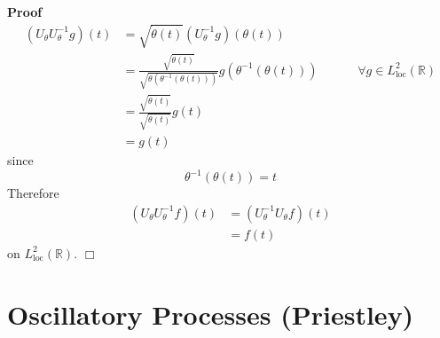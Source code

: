 \documentclass{article}
\newcommand{\tmop}[1]{\ensuremath{\operatorname{#1}}}
\newenvironment{proof}{\noindent\textbf{Proof\ }}{\hspace*{\fill}$\Box$\medskip}
\begin{document}
\begin{proof}
\begin{equation}
    \begin{array}{llcccc}
      (U_{\theta} U_{\theta}^{- 1} g) (t) & = \sqrt{\dot{\theta} (t)} 
      (U_{\theta}^{- 1} g) (\theta (t)) &  &  &  & \\
      & = \frac{\sqrt{\dot{\theta} (t)}}{\sqrt{\dot{\theta} (\theta^{- 1}
      (\theta (t)))}} g (\theta^{- 1} (\theta (t))) &  &  &  & \forall g \in
      L^2_{\tmop{loc}} (\mathbb{R})\\
      & = \frac{\sqrt{\dot{\theta} (t)}}{\sqrt{\dot{\theta} (t)}} g (t) &  & 
      &  & \\
      & = g (t) &  &  &  & 
    \end{array}
  \end{equation}
  since
  \begin{equation}
    \theta^{- 1} (\theta (t)) = t
  \end{equation}
  Therefore
  \begin{equation}
    \begin{array}{ll}
      (U_{\theta} U_{\theta}^{- 1} f) (t) & = (U_{\theta}^{- 1} U_{\theta} f)
      (t)\\
      & = f (t)
    \end{array}
  \end{equation}
  on $L^2_{\tmop{loc}} (\mathbb{R})$.
\end{proof}

\section{Oscillatory Processes (Priestley)}\label{sec:oscillatory}
\end{document}

